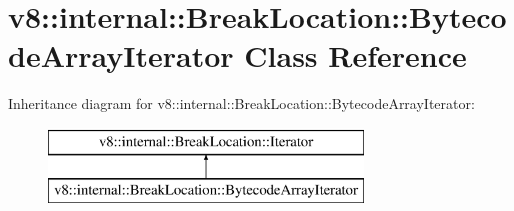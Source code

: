 \hypertarget{classv8_1_1internal_1_1_break_location_1_1_bytecode_array_iterator}{}\section{v8\+:\+:internal\+:\+:Break\+Location\+:\+:Bytecode\+Array\+Iterator Class Reference}
\label{classv8_1_1internal_1_1_break_location_1_1_bytecode_array_iterator}
Inheritance diagram for v8\+:\+:internal\+:\+:Break\+Location\+:\+:Bytecode\+Array\+Iterator\+:\begin{figure}[H]
\begin{center}
\leavevmode
\includegraphics[height=2.000000cm]{classv8_1_1internal_1_1_break_location_1_1_bytecode_array_iterator}
\end{center}
\end{figure}
